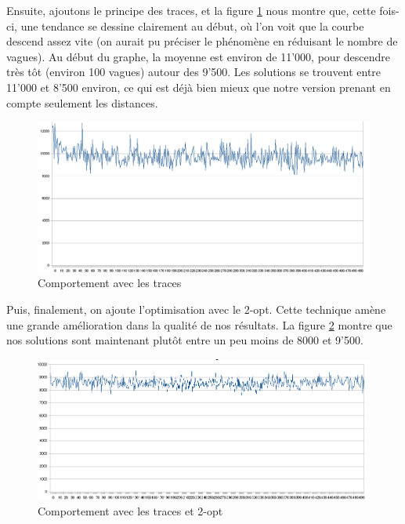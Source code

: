 \documentclass[a4paper, 11pt]{article}
\begin{document}
{	Ensuite, ajoutons le principe des traces, et la figure \ref{fig:2} nous montre que, cette fois-ci, une tendance se dessine clairement au début, où l'on voit que la courbe descend assez vite (on aurait pu préciser le phénomène en réduisant le nombre de vagues). Au début du graphe, la moyenne est environ de 11'000, pour descendre très tôt (environ 100 vagues) autour des 9'500. Les solutions se trouvent entre 11'000 et 8'500 environ, ce qui est déjà bien mieux que notre version prenant en compte seulement les distances.

\begin{figure}[H]
   \begin{center}
      \includegraphics[width=14cm]{../images/2.png}
   \end{center}
   \caption{Comportement avec les traces}
	\label{fig:2}
\end{figure}

	Puis, finalement, on ajoute l'optimisation avec le 2-opt. Cette technique amène une grande amélioration dans la qualité de nos résultats. La figure \ref{fig:3} montre que nos solutions sont maintenant plutôt entre un peu moins de 8000 et 9'500.

\begin{figure}[H]
   \begin{center}
      \includegraphics[width=14cm]{../images/3.png}
   \end{center}
   \caption{Comportement avec les traces et 2-opt}
	\label{fig:3}
\end{figure}

}
\end{document}
